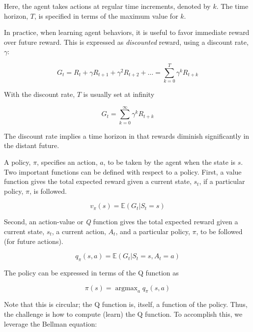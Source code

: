 \documentclass[acmlarge,screen]{acmart}
\DeclareMathOperator*{\argmax}{argmax}
\begin{document}
Here, the agent takes actions at regular time increments, denoted by $k$.  
The time horizon, $T$, is specified in terms of the maximum value for $k$.

In practice, when learning agent behaviors, it is useful to favor immediate reward over future reward. 
This is expressed as \textit{discounted} reward, using a discount rate, $\gamma$:
  
\begin{equation}
  G_t = R_t + \gamma R_{t+1} + \gamma^2 R_{t+2} + \ldots = \sum_{k=0}^T \gamma^k R_{t+k} 
\end{equation}

With the discount rate, $T$ is usually set at infinity

\begin{equation}
  G_t = \sum_{k=0}^\infty \gamma^k R_{t+k} 
\end{equation}

The discount rate implies a time horizon in that rewards diminish significantly in the distant future.

A policy, $\pi$, specifies an action, $a$, to be taken by the agent when the state is $s$.  
Two important functions can be defined with respect to a policy.
First, a value function gives the total expected reward given a current state, $s_t$, 
if a particular policy, $\pi$, is followed.

\begin{equation}
  v_\pi (s) = \mathbb{E} \left( G_t \vert S_t = s \right)
\end{equation}

Second, an action-value or \textit{Q} function gives the total expected reward given a current state, $s_t$, 
a current action, $A_t$,
and a particular policy, $\pi$, to be followed (for future actions).

\begin{equation}
  q_\pi (s,a) = \mathbb{E} \left( G_t \vert S_t = s, A_t = a \right)
\end{equation}

The policy can be expressed in terms of the Q function as

\begin{equation}
  \pi(s) = \argmax_a q_\pi (s,a)
\end{equation}

Note that this is circular;  the Q function is, itself, a function of the policy.  
Thus, the challenge is how to compute (learn) the Q function.
To accomplish this, we leverage the Bellman equation:
\end{document}
